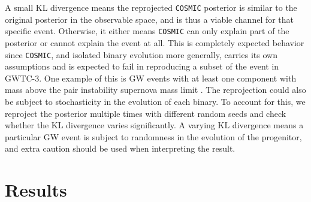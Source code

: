 \documentclass[twocolumn]{aastex631}
\begin{document}
\noindent A small KL divergence means the reprojected \texttt{COSMIC} posterior is similar to the original posterior in the
observable space, and is thus a viable channel for that specific event. Otherwise, it either means \texttt{COSMIC}
can only explain part of the posterior or cannot explain the event at all. This is completely expected behavior since
\texttt{COSMIC}, and isolated binary evolution more generally, carries its own assumptions and is expected to
fail in reproducing a subset of the event in GWTC-3. One example of this is GW events with at least one component
with mass above the pair instability supernova mass limit \citep{Woosley2017, Farmer2019}.
The reprojection could also be subject to stochasticity in the evolution of each binary.
To account for this, we reproject the posterior multiple times with different random seeds and
check whether the KL divergence varies significantly. A varying KL divergence means a particular GW event is subject
to randomness in the evolution of the progenitor, and extra caution should be used when interpreting the result.


\section{Results}
\label{sec:result}
\end{document}
